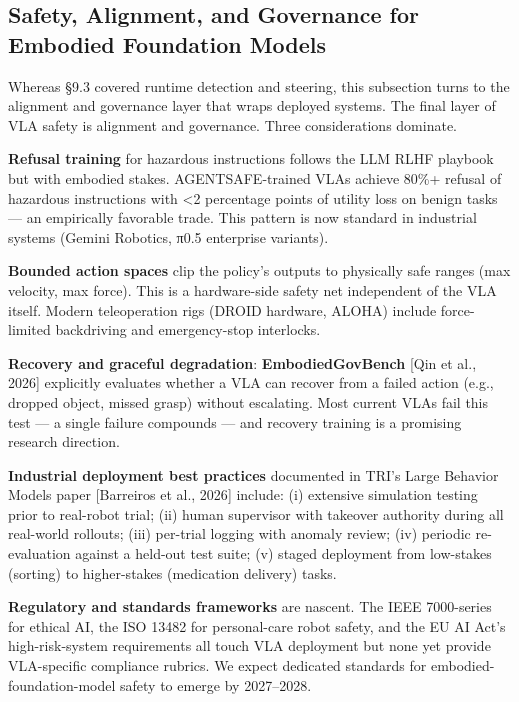 \subsection{Safety, Alignment, and Governance for Embodied Foundation Models}\label{safety-alignment-and-governance-for-embodied-foundation-models}

Whereas §9.3 covered runtime detection and steering, this subsection turns to the alignment and governance layer that wraps deployed systems. The final layer of VLA safety is alignment and governance. Three considerations dominate.

\textbf{Refusal training} for hazardous instructions follows the LLM RLHF playbook but with embodied stakes. AGENTSAFE-trained VLAs achieve 80\%+ refusal of hazardous instructions with \textless2 percentage points of utility loss on benign tasks --- an empirically favorable trade. This pattern is now standard in industrial systems (Gemini Robotics, π0.5 enterprise variants).

\textbf{Bounded action spaces} clip the policy's outputs to physically safe ranges (max velocity, max force). This is a hardware-side safety net independent of the VLA itself. Modern teleoperation rigs (DROID hardware, ALOHA) include force-limited backdriving and emergency-stop interlocks.

\textbf{Recovery and graceful degradation}: \textbf{EmbodiedGovBench} {[}Qin et al., 2026{]} explicitly evaluates whether a VLA can recover from a failed action (e.g., dropped object, missed grasp) without escalating. Most current VLAs fail this test --- a single failure compounds --- and recovery training is a promising research direction.

\textbf{Industrial deployment best practices} documented in TRI's Large Behavior Models paper {[}Barreiros et al., 2026{]} include: (i) extensive simulation testing prior to real-robot trial; (ii) human supervisor with takeover authority during all real-world rollouts; (iii) per-trial logging with anomaly review; (iv) periodic re-evaluation against a held-out test suite; (v) staged deployment from low-stakes (sorting) to higher-stakes (medication delivery) tasks.

\textbf{Regulatory and standards frameworks} are nascent. The IEEE 7000-series for ethical AI, the ISO 13482 for personal-care robot safety, and the EU AI Act's high-risk-system requirements all touch VLA deployment but none yet provide VLA-specific compliance rubrics. We expect dedicated standards for embodied-foundation-model safety to emerge by 2027--2028.

